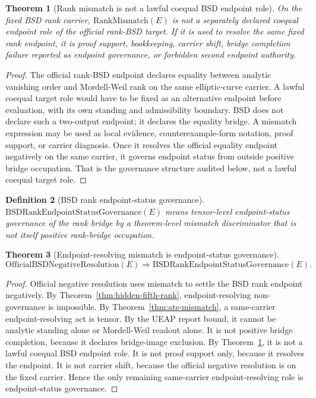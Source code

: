 \documentclass[11pt]{article}
\newtheorem{theorem}{Theorem}[section]
\newtheorem{definition}[theorem]{Definition}
\newcommand{\RankMismatch}{\mathrm{RankMismatch}}
\begin{document}
\begin{theorem}[Rank mismatch is not a lawful coequal BSD endpoint role]\label{thm:mismatch-not-coequal}
On the fixed BSD rank carrier, $\RankMismatch(E)$ is not a separately declared coequal endpoint role of the official rank-BSD target. If it is used to resolve the same fixed rank endpoint, it is proof support, bookkeeping, carrier shift, bridge completion failure reported as endpoint governance, or forbidden second endpoint authority.
\end{theorem}

\begin{proof}
The official rank-BSD endpoint declares equality between analytic vanishing order and Mordell-Weil rank on the same elliptic-curve carrier. A lawful coequal target role would have to be fixed as an alternative endpoint before evaluation, with its own standing and admissibility boundary. BSD does not declare such a two-output endpoint; it declares the equality bridge. A mismatch expression may be used as local evidence, counterexample-form notation, proof support, or carrier diagnosis. Once it resolves the official equality endpoint negatively on the same carrier, it governs endpoint status from outside positive bridge occupation. That is the governance structure audited below, not a lawful coequal target role.
\end{proof}

\begin{definition}[BSD rank endpoint-status governance]
$\mathrm{BSDRankEndpointStatusGovernance}(E)$ means tensor-level endpoint-status governance of the rank bridge by a theorem-level mismatch discriminator that is not itself positive rank-bridge occupation.
\end{definition}

\begin{theorem}[Endpoint-resolving mismatch is endpoint-status governance]\label{thm:mismatch-governance}
\[
\mathrm{OfficialBSDNegativeResolution}(E)
\Rightarrow
\mathrm{BSDRankEndpointStatusGovernance}(E).
\]
\end{theorem}

\begin{proof}
Official negative resolution uses mismatch to settle the BSD rank endpoint negatively. By Theorem~\ref{thm:hidden-fifth-rank}, endpoint-resolving non-governance is impossible. By Theorem~\ref{thm:ats-mismatch}, a same-carrier endpoint-resolving act is tensor. By the UEAP report bound, it cannot be analytic standing alone or Mordell-Weil readout alone. It is not positive bridge completion, because it declares bridge-image exclusion. By Theorem~\ref{thm:mismatch-not-coequal}, it is not a lawful coequal BSD endpoint role. It is not proof support only, because it resolves the endpoint. It is not carrier shift, because the official negative resolution is on the fixed carrier. Hence the only remaining same-carrier endpoint-resolving role is endpoint-status governance.
\end{proof}
\end{document}
